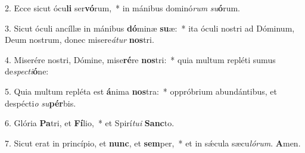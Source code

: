 2. Ecce sicut ócu\textbf{li} ser\textbf{vó}rum,~*  in mánibus dominó\textit{rum} \textit{su}\textbf{ó}rum.\

3. Sicut óculi ancíllæ in mánibus \textbf{dó}minæ \textbf{su}æ:~*  ita óculi nostri ad Dóminum, Deum nostrum, donec misere\textit{á}\textit{tur} \textbf{nos}tri.\

4. Miserére nostri, Dómine, mise\textbf{ré}re \textbf{nos}tri:~*  quia multum repléti sumus de\textit{spec}\textit{ti}\textbf{ó}ne:\

5. Quia multum repléta est \textbf{á}nima \textbf{nos}tra:~*  oppróbrium abundántibus, et despécti\textit{o} \textit{su}\textbf{pér}bis.\

6. Glória \textbf{Pa}tri, et \textbf{Fí}lio,~*  et Spirí\textit{tu}\textit{i} \textbf{Sanc}to.\

7. Sicut erat in princípio, et \textbf{nunc}, et \textbf{sem}per,~*  et in sǽcula sæcu\textit{ló}\textit{rum}. \textbf{A}men.\


